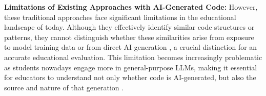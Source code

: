 \documentclass[runningheads]{llncs}
\begin{document}
\noindent \textbf{Limitations of Existing Approaches with AI-Generated Code:} However, these traditional approaches face significant limitations in the educational landscape of today. Although they effectively identify similar code structures or patterns, they cannot distinguish whether these similarities arise from exposure to model training data or from direct AI generation \cite{r27, r18}, a crucial distinction for an accurate educational evaluation. This limitation becomes increasingly problematic as students nowadays engage more in general-purpose LLMs, making it essential for educators to understand not only whether code is AI-generated, but also the source and nature of that generation \cite{r28}. 


\end{document}
